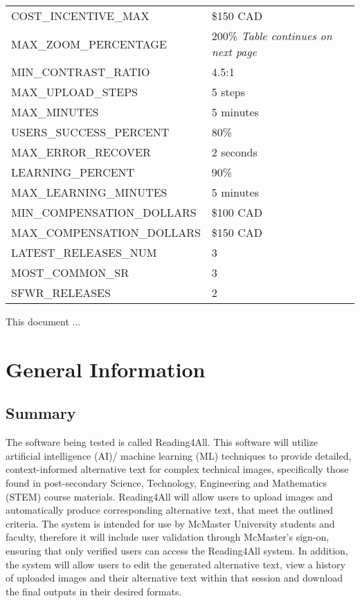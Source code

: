 \documentclass[12pt, titlepage]{article}
\begin{document}
\begin{longtable}{|p{8.0cm}|p{8.0cm}|}
COST\_INCENTIVE\_MAX & \$150 CAD \\
MAX\_ZOOM\_PERCENTAGE & 200\% \qquad\textit{Table continues on next page}\\
MIN\_CONTRAST\_RATIO & 4.5:1\\
MAX\_UPLOAD\_STEPS & 5 steps\\
MAX\_MINUTES & 5 minutes\\
USERS\_SUCCESS\_PERCENT & 80\%\\
MAX\_ERROR\_RECOVER & 2 seconds \\
LEARNING\_PERCENT & 90\% \\
MAX\_LEARNING\_MINUTES & 5 minutes \\
MIN\_COMPENSATION\_DOLLARS & \$100 CAD \\ 
MAX\_COMPENSATION\_DOLLARS & \$150 CAD \\ 
LATEST\_RELEASES\_NUM & 3 \\
MOST\_COMMON\_SR & 3 \\
SFWR\_RELEASES & 2 \\


\bottomrule
\end{longtable}

\newpage


This document ... 

\section{General Information}

\subsection{Summary}


The software being tested is called Reading4All. This software will utilize artificial intelligence (AI)/
machine learning (ML) techniques to provide detailed, context-informed alternative text for complex technical images, specifically those found in post-secondary Science, Technology, Engineering and Mathematics (STEM)
course materials. Reading4All will allow users to upload images and automatically produce corresponding alternative text, that meet the outlined criteria. The system is intended for use by McMaster University students and faculty, therefore it will include user validation through McMaster's sign-on, ensuring that only verified users can access the Reading4All system.  
In addition, the system will allow users to edit the generated alternative text, view a history of uploaded images and their alternative text within that session and download the final outputs in their desired formats.
\end{document}
